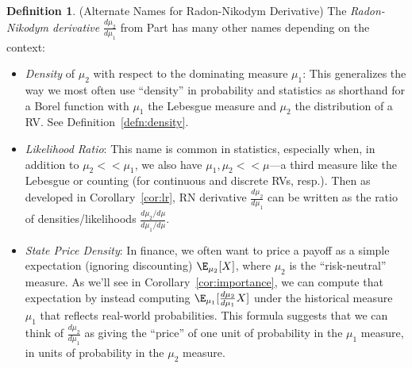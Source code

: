 \documentclass[12pt]{article}
\theoremstyle{plain}
\theoremstyle{definition}
\newtheorem{defn}[thm]{Definition}
\theoremstyle{remark}
\begin{document}
\begin{defn}(Alternate Names for Radon-Nikodym Derivative)
The \emph{Radon-Nikodym derivative} $\frac{d\mu_2}{d\mu_1}$ from Part
has many other names depending on the context:
\begin{itemize}
  \item \emph{Density} of $\mu_2$ with respect to the dominating measure
    $\mu_1$:
    This generalizes
    the way we most often use ``density''
    in probability and statistics as shorthand for a Borel function with
    $\mu_1$ the Lebesgue measure and $\mu_2$ the distribution of a RV.
    See Definition~\ref{defn:density}.

  \item
    \emph{Likelihood Ratio}:
    This name is common in statistics, especially when, in addition
    to $\mu_2<<\mu_1$, we also have $\mu_1,\mu_2<<\mu$---a third measure
    like the Lebesgue or counting (for continuous and discrete
    RVs, resp.). Then as developed in Corollary~\ref{cor:lr},
    RN derivative $\frac{d\mu_2}{d\mu_1}$ can be written as the ratio of
    densities/likelihoods $\frac{d\mu_2/d\mu}{d\mu_1/d\mu}$.

  \item
    \emph{State Price Density}:
    In finance, we often want to price a payoff as a simple expectation
    (ignoring discounting) $\E_{\mu_2}[X]$, where $\mu_2$ is the
    ``risk-neutral'' measure. As we'll see in
    Corollary~\ref{cor:importance}, we can compute that expectation by
    instead computing $\E_{\mu_1}[\frac{d\mu_2}{d\mu_1}X]$ under the
    historical measure $\mu_1$ that reflects real-world probabilities.
    This formula suggests that  we can think of
    $\frac{d\mu_2}{d\mu_1}$ as giving the ``price'' of one unit of
    probability in the $\mu_1$ measure, in units of probability in the
    $\mu_2$ measure.
\end{itemize}
\end{defn}
\end{document}

